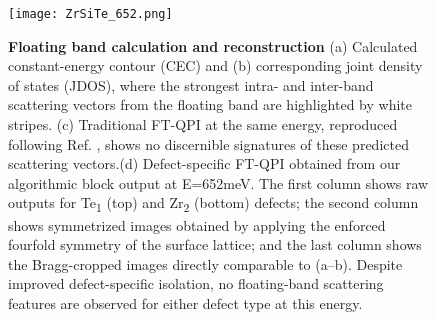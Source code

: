 \begin{figure}
	\texttt{[image: ZrSiTe\_652.png]} 
	\centering
	\captionsetup{width=1.2\textwidth}
	\caption[\textbf{Floating band calculation and reconstruction}]{\textbf{Floating band calculation and reconstruction} (a) Calculated constant-energy contour (CEC) and (b) corresponding joint density of states (JDOS), where the strongest intra- and inter-band scattering vectors from the floating band are highlighted by white stripes. (c) Traditional FT-QPI at the same energy, reproduced following Ref. \cite{stuartScanningTunnellingMicroscopy2021}, shows no discernible signatures of these predicted scattering vectors.(d) Defect-specific FT-QPI obtained from our algorithmic block output at E=652meV. The first column shows raw outputs for Te\textsubscript{1} (top) and Zr\textsubscript{2} (bottom) defects; the second column shows symmetrized images obtained by applying the enforced fourfold symmetry of the surface lattice; and the last column shows the Bragg-cropped images directly comparable to (a–b). Despite improved defect-specific isolation, no floating-band scattering features are observed for either defect type at this energy.}
	\label{fig:ZrSiTe_652}
\end{figure}


